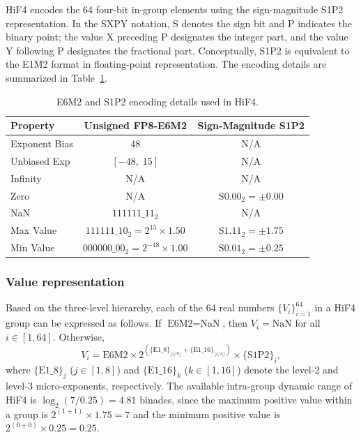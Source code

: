 \documentclass{article}
\begin{document}
HiF4 encodes the 64 four-bit in-group elements using the sign-magnitude S1P2
representation. In the SXPY notation, S denotes the sign bit and P indicates
the binary point; the value X preceding P designates the integer part, and the
value Y following P designates the fractional part. Conceptually, S1P2 is
equivalent to the E1M2 format in floating-point representation. The encoding
details are summarized in Table~\ref{tab:hif4-encoding}.

\begin{table}[h]
\caption{E6M2 and S1P2 encoding details used in HiF4.}
\label{tab:hif4-encoding}
\centering
\small
\begin{tabular}{@{}lcc@{}}
\toprule
Property & Unsigned FP8-E6M2 & Sign-Magnitude S1P2 \\
\midrule
Exponent Bias   & 48              & N/A \\
Unbiased Exp    & $[-48,\;15]$    & N/A \\
Infinity        & N/A             & N/A \\
Zero            & N/A             & $\text{S}0.00_2 = \pm 0.00$ \\
NaN             & $111111\_11_2$  & N/A \\
Max Value       & $111111\_10_2 = 2^{15} \times 1.50$ & $\text{S}1.11_2 = \pm 1.75$ \\
Min Value       & $000000\_00_2 = 2^{-48} \times 1.00$ & $\text{S}0.01_2 = \pm 0.25$ \\
\bottomrule
\end{tabular}
\end{table}

\subsubsection{Value representation}

Based on the three-level hierarchy, each of the 64 real numbers
$\{V_i\}_{i=1}^{64}$ in a HiF4 group can be expressed as follows. If
$\text{E6M2} = \text{NaN}$, then $V_i = \text{NaN}$ for all
$i \in [1, 64]$. Otherwise,
\begin{equation}
  V_i
  =
  \text{E6M2}
  \times
  2^{\left(\{\text{E1\_8}\}_{\lfloor i/8 \rfloor}
    + \{\text{E1\_16}\}_{\lfloor i/4 \rfloor}\right)}
  \times
  \{\text{S1P2}\}_i ,
  \label{eq:hif4-value}
\end{equation}
where $\{\text{E1\_8}\}_j$ ($j \in [1,8]$) and
$\{\text{E1\_16}\}_k$ ($k \in [1,16]$) denote the level-2 and level-3
micro-exponents, respectively. The available intra-group dynamic range of HiF4
is $\log_2(7/0.25) = 4.81$ binades, since the maximum positive value within a
group is $2^{(1+1)} \times 1.75 = 7$ and the minimum positive value is
$2^{(0+0)} \times 0.25 = 0.25$.
\end{document}
